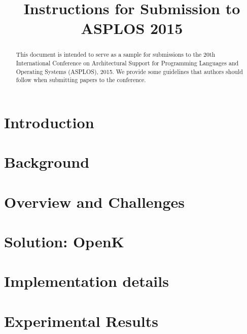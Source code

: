 \documentclass[pageno]{jpaper}
\begin{document}
	
\newcommand {\TODO}[1]{\textcolor{red}{TODO #1}}

\title{
	Instructions for Submission to ASPLOS 2015}

\date{}
\maketitle

\thispagestyle{empty}

\begin{abstract}
	
	This document is intended to serve as a sample for submissions to the 20th
	International Conference on Architectural Support for Programming Languages
	and Operating Systems (ASPLOS), 2015.  We provide some guidelines that 
	authors should follow when submitting papers to the conference. 
	
\end{abstract}

\section{Introduction}
\label{sec:intro}

\section{Background}
\label{sec:background}


\section{Overview and Challenges}
\label{sec:overview}


\section{Solution: OpenK}
\label{sec:openk}


\section{Implementation details}
\label{sec:impl}



\section{Experimental Results}
\label{sec:exp}

\end{document}
